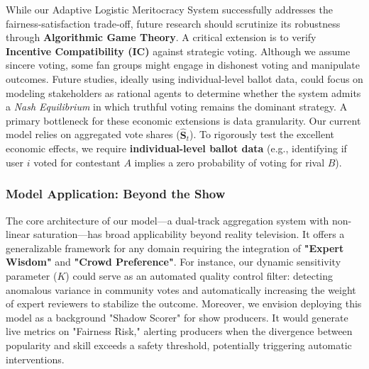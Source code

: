While our Adaptive Logistic Meritocracy System successfully addresses the fairness-satisfaction trade-off, future research should scrutinize its robustness through \textbf{Algorithmic Game Theory}. A critical extension is to verify \textbf{Incentive Compatibility (IC)} against strategic voting. Although we assume sincere voting, some fan groups might engage in dishonest voting and manipulate outcomes. Future studies, ideally using individual-level ballot data, could focus on modeling stakeholders as rational agents to determine whether the system admits a \textit{Nash Equilibrium} in which truthful voting remains the dominant strategy. A primary bottleneck for these economic extensions is data granularity. Our current model relies on aggregated vote shares ($\hat{\mathbf{S}}_t$). To rigorously test the excellent economic effects, we require \textbf{individual-level ballot data} (e.g., identifying if user $i$ voted for contestant $A$ implies a zero probability of voting for rival $B$).

\subsubsection{Model Application: Beyond the Show}

The core architecture of our model—a dual-track aggregation system with non-linear saturation—has broad applicability beyond reality television. It offers a generalizable framework for any domain requiring the integration of \textbf{"Expert Wisdom"} and \textbf{"Crowd Preference"}. For instance, our dynamic sensitivity parameter ($K$) could serve as an automated quality control filter: detecting anomalous variance in community votes and automatically increasing the weight of expert reviewers to stabilize the outcome. Moreover, we envision deploying this model as a background "Shadow Scorer" for show producers. It would generate live metrics on "Fairness Risk," alerting producers when the divergence between popularity and skill exceeds a safety threshold, potentially triggering automatic interventions.